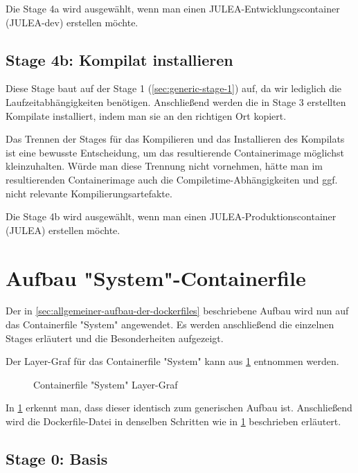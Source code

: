 Die Stage 4a wird ausgewählt, wenn man einen JULEA-Entwicklungscontainer (JULEA-dev) erstellen möchte. 

\subsection{Stage 4b: Kompilat installieren} \label{sec:generic-stage-4b}

Diese Stage baut auf der Stage 1 (\cref{sec:generic-stage-1}) auf, da wir lediglich die Laufzeitabhängigkeiten benötigen. Anschließend werden die in Stage 3 erstellten Kompilate installiert, indem man sie an den richtigen Ort kopiert. 

Das Trennen der Stages für das Kompilieren und das Installieren des Kompilats ist eine bewusste Entscheidung, um das resultierende Containerimage möglichst kleinzuhalten. Würde man diese Trennung nicht vornehmen, hätte man im resultierenden Containerimage auch die Compiletime-Abhängigkeiten und ggf. nicht relevante Kompilierungsartefakte. 

Die Stage 4b wird ausgewählt, wenn man einen JULEA-Produktionscontainer (JULEA) erstellen möchte.

\section{Aufbau "System"-Containerfile}

Der in \cref{sec:allgemeiner-aufbau-der-dockerfiles} beschriebene Aufbau wird nun auf das Containerfile "System" angewendet. Es werden anschließend die einzelnen Stages erläutert und die Besonderheiten aufgezeigt.

Der Layer-Graf für das Containerfile "System" kann aus \cref{fig:system-layer-graph} entnommen werden.
\begin{figure}[!htbp]
    \centering
    
    \caption{Containerfile "System" Layer-Graf}
    \label{fig:system-layer-graph}
\end{figure}
\FloatBarrier

In \cref{fig:system-layer-graph} erkennt man, dass dieser identisch zum generischen Aufbau ist. Anschließend wird die Dockerfile-Datei in denselben Schritten wie in \cref{fig:system-layer-graph} beschrieben erläutert.

\subsection{Stage 0: Basis} \label{sec:system-stage-0}

